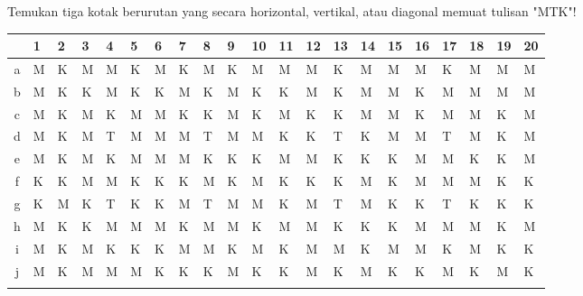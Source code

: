 \documentclass{../praktikum-ppt}
\begin{document}
    \begin{frame}
      \begin{game}
      Temukan tiga kotak berurutan yang secara horizontal, vertikal, atau diagonal memuat tulisan "MTK"! 
      \end{game}
      \begin{table}[h!]
        \small
      \begin{tabular}{>{\columncolor{black}}c|*{20}{>{\centering\arraybackslash}m{0.85em}|}}
        \rowcolor{black}& {\color{white}1} & {\color{white}2} & {\color{white}3} & {\color{white}4} & {\color{white}5} & {\color{white}6} & {\color{white}7} & {\color{white}8} & {\color{white}9} & {\color{white}10} & {\color{white}11} & {\color{white}12} & {\color{white}13} & {\color{white}14} & {\color{white}15} & {\color{white}16} & {\color{white}17} & {\color{white}18} & {\color{white}19} & {\color{white}20}\\\cline{2-21}
        {\color{white}a} & M & K & M & M & K & M & K & M & K & M & M & M & K & M & M & M & K & M & M & M \\\cline{2-21}
        {\color{white}b} & M & K & K & M & K & K & M & K & M & K & K & M & K & M & M & K & M & M & M & M \\\cline{2-21}
        {\color{white}c} & M & K & M & K & M & M & K & K & M & K & M & K & K & M & M & K & M & M & K & M \\\cline{2-21}
        {\color{white}d} & M & K & M & T & M & M & M & T & M & M & K & K & T & K & M & M & T & M & K & M \\\cline{2-21}
        {\color{white}e} & M & K & M & K & M & M & M & K & K & K & M & M & K & K & K & M & M & K & K & M \\\cline{2-21}
        {\color{white}f} & K & K & M & M & K & K & K & M & K & M & K & K & K & M & K & M & M & M & K & K \\\cline{2-21}
        {\color{white}g} & K & M & K & T & K & K & M & T & M & M & K & M & T & M & K & K & T & K & K & K \\\cline{2-21}
        {\color{white}h} & M & K & K & M & M & M & K & M & M & K & M & M & K & K & K & M & M & M & K & M \\\cline{2-21}
        {\color{white}i} & M & K & M & K & K & K & M & M & K & M & K & M & M & K & M & M & K & M & K & K \\\cline{2-21}
        {\color{white}j} & M & K & M & M & M & K & K & K & M & K & K & M & K & M & K & K & M & K & M & K \\\cline{2-21}
        \end{tabular}
      \end{table}
    \end{frame}
\end{document}
